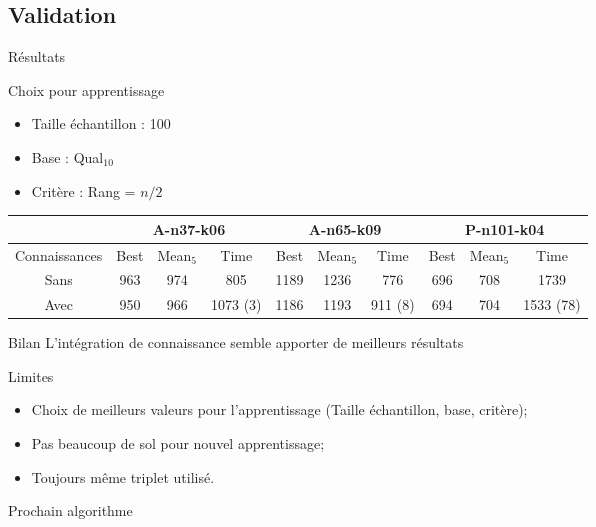 \documentclass{beamer}
\begin{document}
\subsection{Validation}
\begin{frame}{Résultats}

\begin{block}{Choix pour apprentissage}
\begin{itemize}
\item Taille échantillon : 100
\item Base : Qual$_{10}$
\item Critère : Rang = $n/2$
\end{itemize}

\end{block}
\begin{table}[H]

\begin{tabular}{|@{}c@{}|@{}c@{}|@{}c@{}|@{}c@{}|@{}c@{}|@{}c@{}|@{}c@{}|@{}c@{}|@{}c@{}|@{}c@{}|}
   \hline
    & \multicolumn{3}{c|}{A-n37-k06} & \multicolumn{3}{c|}{A-n65-k09} & \multicolumn{3}{c|}{P-n101-k04} \\
   \hline
   Connaissances & Best & Mean$_5$ & Time & Best & Mean$_5$ & Time & Best & Mean$_5$ & Time \\
   \hline
   Sans &  963 & 974 & 805 & 1189 & 1236 & 776 & 696 & 708 & 1739  \\   
   \hline
   Avec & 950 & 966 & 1073 (3) & 1186 & 1193 & 911 (8) & 694 & 704 & 1533 (78) \\
   \hline
\end{tabular}
\end{table}
\begin{exampleblock}{Bilan}
L'intégration de connaissance semble apporter de meilleurs résultats
\end{exampleblock}
\end{frame}

\begin{frame}{Limites}
\begin{itemize}
\item Choix de meilleurs valeurs pour l'apprentissage (Taille échantillon, base, critère);
\item Pas beaucoup de sol pour nouvel apprentissage;
\item Toujours même triplet utilisé.
\end{itemize}
\end{frame}

\begin{frame}{Prochain algorithme}

\end{frame}
\end{document}
